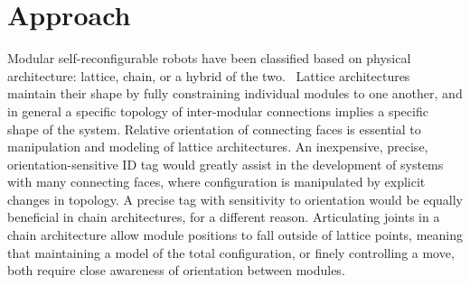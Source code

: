 \section{Approach}
\label{sec:Approach}

Modular self-reconfigurable robots have been classified based on physical architecture: lattice, chain, or a hybrid of the two.~\cite{Yim-RAM07}\cite{Moubarak2012}\cite{surveyyim} Lattice architectures maintain their shape by fully constraining individual modules to one another, and in general a specific topology of inter-modular connections implies a specific shape of the system. Relative orientation of connecting faces is essential to manipulation and modeling of lattice architectures. An inexpensive, precise, orientation-sensitive ID tag would greatly assist in the development of systems with many connecting faces, where configuration is manipulated by explicit changes in topology. A precise tag with sensitivity to orientation would be equally beneficial in chain architectures, for a different reason. Articulating joints in a chain architecture allow module positions to fall outside of lattice points, meaning that maintaining a model of the total configuration, or finely controlling a move, both require close awareness of orientation between modules. 